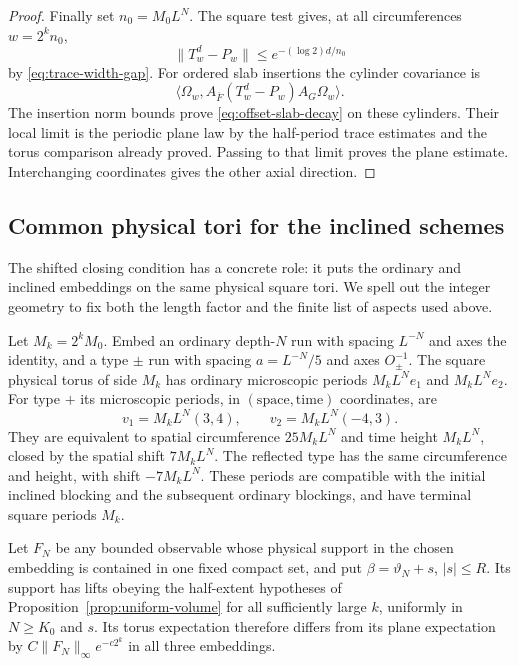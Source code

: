 \begin{proof}
Finally set $n_0=M_0L^N$.  The square test gives, at all
circumferences $w=2^kn_0$,
\[
 \|T_w^d-P_w\|\le e^{-(\log2)d/n_0}
\]
by \eqref{eq:trace-width-gap}.  For ordered slab insertions the
cylinder covariance is
\[
 \langle\Omega_w,
       A_{\overline F}(T_w^d-P_w)A_G\Omega_w\rangle.
\]
The insertion norm bounds prove \eqref{eq:offset-slab-decay} on
these cylinders.  Their local limit is the periodic plane law by
the half-period trace estimates and the torus comparison already
proved.  Passing to that limit proves the plane estimate.
Interchanging coordinates gives the other axial direction.
\end{proof}

\subsection{Common physical tori for the inclined schemes}

The shifted closing condition has a concrete role: it puts the
ordinary and inclined embeddings on the same physical square tori.
We spell out the integer geometry to fix both the length factor and
the finite list of aspects used above.

\begin{lemma}
\label{lem:inclined-periods}
Let $M_k=2^kM_0$.  Embed an ordinary depth-$N$ run with spacing
$L^{-N}$ and axes the identity, and a type $\pm$ run with spacing
$a=L^{-N}/5$ and axes $O_\pm^{-1}$.  The square physical torus of
side $M_k$ has ordinary microscopic periods $M_kL^N e_1$ and
$M_kL^N e_2$.  For type $+$ its microscopic periods, in
$(\mathrm{space},\mathrm{time})$ coordinates, are
\begin{equation}
 v_1=M_kL^N(3,4),\qquad v_2=M_kL^N(-4,3).
 \label{eq:offset-inclined-periods}
\end{equation}
They are equivalent to spatial circumference $25M_kL^N$ and time
height $M_kL^N$, closed by the spatial shift $7M_kL^N$.
The reflected type has the same circumference and height, with
shift $-7M_kL^N$.  These periods are compatible with the initial
inclined blocking and the subsequent ordinary blockings, and have
terminal square periods $M_k$.

Let $F_N$ be any bounded observable whose physical support in the
chosen embedding is contained in one fixed compact set, and put
$\beta=\vartheta_N+s$, $|s|\le R$.  Its support has lifts obeying
the half-extent hypotheses of Proposition~\ref{prop:uniform-volume}
for all sufficiently large $k$, uniformly in $N\ge K_0$ and $s$.
Its torus expectation therefore differs from its plane expectation
by $C\|F_N\|_\infty e^{-c2^k}$ in all three embeddings.
\end{lemma}

